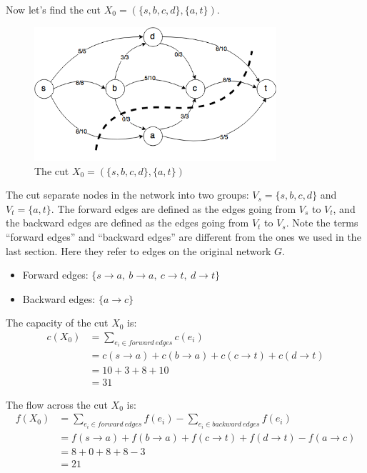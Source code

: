\documentclass{article}
\begin{document}
Now let's find the cut $X_0 = (\{s,b,c,d\}, \{a,t\})$.

\begin{figure}[H]
\centering
\includegraphics[width=0.8\textwidth]{g_2.png}
\caption{The cut $X_0 = (\{s,b,c,d\}, \{a,t\})$}
\end{figure}

The cut separate nodes in the network into two groups:
$V_s = \{s, b, c, d\}$ and $V_t = \{a, t\}$. The forward edges are defined
as the edges going from $V_s$ to $V_t$, and the backward edges are defined
as the edges going from $V_t$ to $V_s$. Note the terms ``forward edges''
and ``backward edges'' are different from the ones we used in the last section.
Here they refer to edges on the original network $G$.
\begin{itemize}
\item Forward edges: $\{s \rightarrow a,~ b \rightarrow a,~ c \rightarrow t,~
d\rightarrow t\}$
\item Backward edges: $\{a \rightarrow c\}$
\end{itemize}

The capacity of the cut $X_0$ is:
\begin{equation}
	\begin{split}
		c(X_0) &= \sum_{e_i \in forward~edges} c(e_i)\\
		&=c(s \rightarrow a) + c(b \rightarrow a) + 
		c(c \rightarrow t) + c(d\rightarrow t)\\
		&= 10 + 3 + 8 + 10 \\
		&= 31
	\end{split}
\end{equation}

The flow across the cut $X_0$ is:
\begin{equation}
	\begin{split}
		f(X_0) &= \sum_{e_i \in forward~edges} f(e_i)
		- \sum_{e_i \in backward~edges} f(e_i)\\
		&= f(s \rightarrow a) + f(b \rightarrow a) + 
		f(c \rightarrow t) + f(d\rightarrow t) - f(a \rightarrow c)\\
		&= 8+0+8+8-3\\
		&= 21
	\end{split}
\end{equation}
\end{document}
